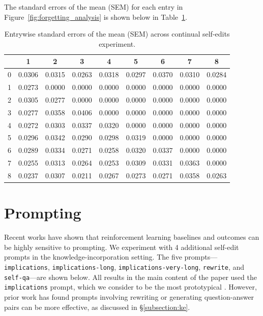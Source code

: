\documentclass{article}
\begin{document}
The standard errors of the mean (SEM) for each entry in Figure~\ref{fig:forgetting_analysis} is shown below in Table~\ref{tab:SEM}.

\begin{table}[h]
\label{tab:SEM}
\centering
\caption{Entrywise standard errors of the mean (SEM) across continual self-edits experiment.}
\begin{tabular}{c|cccccccc}
\toprule
 & 1 & 2 & 3 & 4 & 5 & 6 & 7 & 8 \\
\midrule
0 & 0.0306 & 0.0315 & 0.0263 & 0.0318 & 0.0297 & 0.0370 & 0.0310 & 0.0284 \\
1 & 0.0273 & 0.0000 & 0.0000 & 0.0000 & 0.0000 & 0.0000 & 0.0000 & 0.0000 \\
2 & 0.0305 & 0.0277 & 0.0000 & 0.0000 & 0.0000 & 0.0000 & 0.0000 & 0.0000 \\
3 & 0.0277 & 0.0358 & 0.0406 & 0.0000 & 0.0000 & 0.0000 & 0.0000 & 0.0000 \\
4 & 0.0272 & 0.0303 & 0.0337 & 0.0320 & 0.0000 & 0.0000 & 0.0000 & 0.0000 \\
5 & 0.0296 & 0.0342 & 0.0290 & 0.0298 & 0.0319 & 0.0000 & 0.0000 & 0.0000 \\
6 & 0.0289 & 0.0334 & 0.0271 & 0.0258 & 0.0320 & 0.0337 & 0.0000 & 0.0000 \\
7 & 0.0255 & 0.0313 & 0.0264 & 0.0253 & 0.0309 & 0.0331 & 0.0363 & 0.0000 \\
8 & 0.0237 & 0.0307 & 0.0211 & 0.0267 & 0.0273 & 0.0271 & 0.0358 & 0.0263 \\
\bottomrule
\end{tabular}
\end{table}


\section{Prompting}
\label{app:prompting}

Recent works have shown that reinforcement learning baselines and outcomes can be highly sensitive to prompting. We experiment with 4 additional self-edit prompts in the knowledge-incorporation setting. The five prompts---\texttt{implications}, \texttt{implications-long}, \texttt{implications-very-long}, \texttt{rewrite}, and \texttt{self-qa}---are shown below. All results in the main content of the paper used the \texttt{implications} prompt, which we consider to be the most prototypical \citep{akyurek2024deductive, lampinen2025generalizationlanguagemodelsincontext}. However, prior work has found prompts involving rewriting or generating question-answer pairs can be more effective, as discussed in \S\ref{subsection:ke}.
\end{document}
